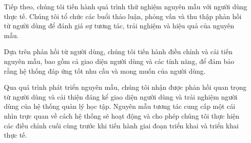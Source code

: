 \documentclass[../Thesis.tex]{subfiles}
\begin{document}
Tiếp theo, chúng tôi tiến hành quá trình thử nghiệm nguyên mẫu với người dùng thực tế. Chúng tôi tổ chức các buổi thảo luận, phỏng vấn và thu thập phản hồi từ người dùng để đánh giá sự tương tác, trải nghiệm và hiệu quả của nguyên mẫu.

Dựa trên phản hồi từ người dùng, chúng tôi tiến hành điều chỉnh và cải tiến nguyên mẫu, bao gồm cả giao diện người dùng và các tính năng, để đảm bảo rằng hệ thống đáp ứng tốt nhu cầu và mong muốn của người dùng.

Qua quá trình phát triển nguyên mẫu, chúng tôi nhận được phản hồi quan trọng từ người dùng và cải thiện đáng kể giao diện người dùng và trải nghiệm người dùng của hệ thống quản lý học tập. Nguyên mẫu tương tác cung cấp một cái nhìn trực quan về cách hệ thống sẽ hoạt động và cho phép chúng tôi thực hiện các điều chỉnh cuối cùng trước khi tiến hành giai đoạn triển khai và triển khai thực tế.
\end{document}
